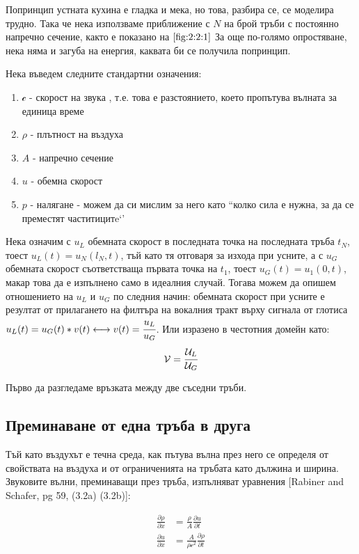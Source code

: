 \documentclass[main.tex]{subfiles}
\begin{document}
Попринцип устната кухина е гладка и мека, но това, разбира се, се моделира трудно. Така че нека използваме приближение с $N$ на брой тръби с постоянно напречно сечение, както е показано на $\autoref{fig:2:2:1}$
За още по-голямо опростяване, нека няма и загуба на енергия, каквата би се получила попринцип.

Нека въведем следните стандартни означения:
\begin{enumerate}
    \item{$\mathcal{c}$} - скорост на звука , т.е. това е разстоянието, което пропътува вълната за единица време
    \item{$\rho$} - плътност на въздуха
    \item{$A$} - напречно сечение
    \item{$u$} - обемна скорост
    \item{$p$} -  налягане - можем да си мислим за него като ``колко сила е нужна, за да се преместят частитицитe`'
\end{enumerate}

Нека означим с $u_L$ обемната скорост в последната точка на последната тръба $t_N$, тоест $u_L(t) = u_N(l_N, t)$, тъй като тя отговаря за изхода при усните, 
а с $u_G$ обемната скорост съответстваща първата точка на $t_1$, тоест $u_G(t) = u_1(0, t)$, макар това да е изпълнено само в идеалния случай.
Тогава можем да опишем отношението на $u_L$ и $u_G$ по следния начин: обемната скорост при усните е резултат от прилагането на филтъра на вокалния тракт върху сигнала
от глотиса  $u_L(t) = u_G(t)\ast v(t) \longleftrightarrow v(t) = \cfrac{u_L}{u_G}$.
Или изразено в честотния домейн като:
\[
    \mathcal{V} = \cfrac{\mathcal{U}_L}{\mathcal{U}_G}
\]

Първо да разгледаме връзката между две съседни тръби.

\subsection{Преминаване от една тръба в друга}

Тъй като въздухът е течна среда, как пътува вълна през него се определя от свойствата на въздуха и от ограниченията на тръбата като дължина и ширина. Звуковите вълни, преминаващи през
тръба, изпълняват уравнения [Rabiner and Schafer, pg 59, (3.2a) (3.2b)]:

\begin{subequations}
    \label{eq:tubes:01}
    \begin{align}
        \label{eq:tubes:01:a} \frac{\partial\rho}{\partial x} & = \frac{\rho}{A} \frac{\partial u}{\partial t}\\
        \label{eq:tubes:01:b} \frac{\partial u}{\partial x} & = \frac{A}{\rho \mathcal{c}^2} \frac{\partial \rho}{\partial t}
    \end{align}
\end{subequations}
\end{document}
